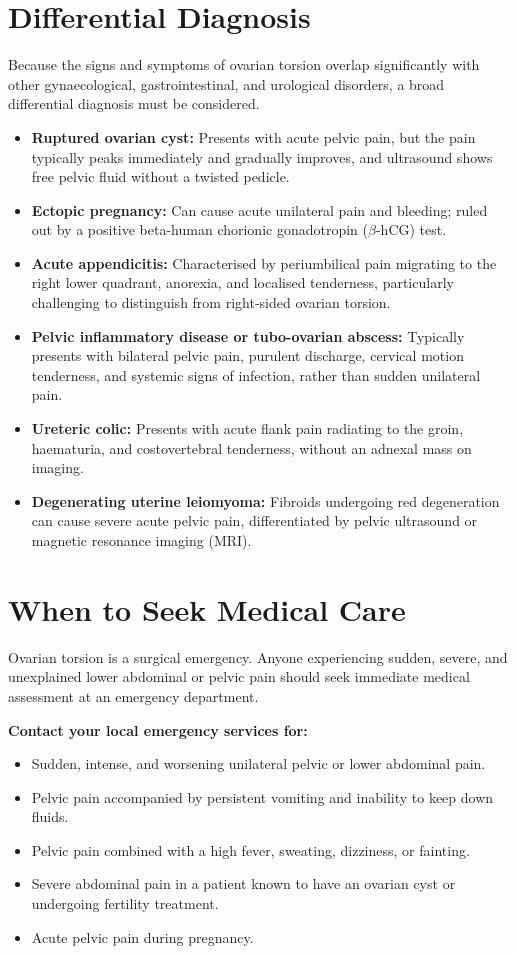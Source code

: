 \section*{Differential Diagnosis}
Because the signs and symptoms of ovarian torsion overlap significantly with other gynaecological, gastrointestinal, and urological disorders, a broad differential diagnosis must be considered.

\begin{itemize}
    \item \textbf{Ruptured ovarian cyst:} Presents with acute pelvic pain, but the pain typically peaks immediately and gradually improves, and ultrasound shows free pelvic fluid without a twisted pedicle.
    \item \textbf{Ectopic pregnancy:} Can cause acute unilateral pain and bleeding; ruled out by a positive beta-human chorionic gonadotropin ($\beta$-hCG) test.
    \item \textbf{Acute appendicitis:} Characterised by periumbilical pain migrating to the right lower quadrant, anorexia, and localised tenderness, particularly challenging to distinguish from right-sided ovarian torsion.
    \item \textbf{Pelvic inflammatory disease or tubo-ovarian abscess:} Typically presents with bilateral pelvic pain, purulent discharge, cervical motion tenderness, and systemic signs of infection, rather than sudden unilateral pain.
    \item \textbf{Ureteric colic:} Presents with acute flank pain radiating to the groin, haematuria, and costovertebral tenderness, without an adnexal mass on imaging.
    \item \textbf{Degenerating uterine leiomyoma:} Fibroids undergoing red degeneration can cause severe acute pelvic pain, differentiated by pelvic ultrasound or magnetic resonance imaging (MRI).
\end{itemize}

\section*{When to Seek Medical Care}
Ovarian torsion is a surgical emergency. Anyone experiencing sudden, severe, and unexplained lower abdominal or pelvic pain should seek immediate medical assessment at an emergency department.

\textbf{Contact your local emergency services for:}
\begin{itemize}
    \item Sudden, intense, and worsening unilateral pelvic or lower abdominal pain.
    \item Pelvic pain accompanied by persistent vomiting and inability to keep down fluids.
    \item Pelvic pain combined with a high fever, sweating, dizziness, or fainting.
    \item Severe abdominal pain in a patient known to have an ovarian cyst or undergoing fertility treatment.
    \item Acute pelvic pain during pregnancy.
\end{itemize}

